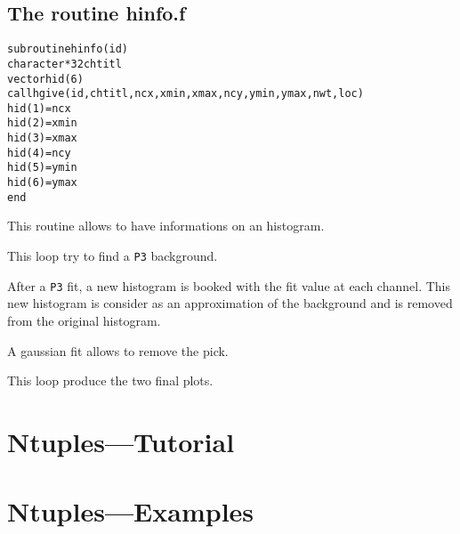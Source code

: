 \subsection*{The routine hinfo.f}
\begin{alltt}
      subroutine hinfo(id)
      character*32 chtitl
      vector hid(6)
      call hgive(id,chtitl,ncx,xmin,xmax,ncy,ymin,ymax,nwt,loc)
      hid(1) = ncx
      hid(2) = xmin
      hid(3) = xmax
      hid(4) = ncy
      hid(5) = ymin
      hid(6) = ymax
      end
\end{alltt} 
\begin{DinglistE}
\item This routine allows to have informations on an histogram.
\item This loop try to find a {\tt P3} background.
\item After a {\tt P3} fit, a new histogram is booked with the fit
      value at each channel. This new histogram is consider as an
      approximation of the background and is removed from the original
      histogram.
\item A gaussian fit allows to remove the pick.
\item This loop produce the two final plots.
\end{DinglistE}
\clearpage
\mbox{}

\clearpage
\section{Ntuples---Tutorial}
\clearpage
{}
\clearpage
{}
\clearpage
{}
\clearpage
{}
\clearpage
{}
\clearpage

\section{Ntuples---Examples}
